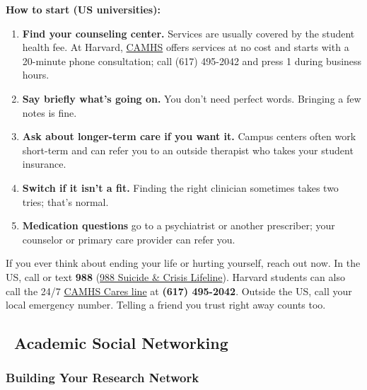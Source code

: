 \documentclass[11pt,a4paper]{article}
\begin{document}
\textbf{How to start (US universities):}
\begin{enumerate}
    \item \textbf{Find your counseling center.} Services are usually covered by the student health fee. At Harvard, \href{https://camhs.huhs.harvard.edu/}{CAMHS} offers services at no cost and starts with a 20-minute phone consultation; call (617) 495-2042 and press 1 during business hours.
    \item \textbf{Say briefly what's going on.} You don't need perfect words. Bringing a few notes is fine.
    \item \textbf{Ask about longer-term care if you want it.} Campus centers often work short-term and can refer you to an outside therapist who takes your student insurance.
    \item \textbf{Switch if it isn't a fit.} Finding the right clinician sometimes takes two tries; that's normal.
    \item \textbf{Medication questions} go to a psychiatrist or another prescriber; your counselor or primary care provider can refer you.
\end{enumerate}

\begin{tcolorbox}[colback=red!5,colframe=red!50,title={If You Are in Crisis}]
If you ever think about ending your life or hurting yourself, reach out now. In the US, call or text \textbf{988} (\href{https://988lifeline.org/}{988 Suicide \& Crisis Lifeline}). Harvard students can also call the 24/7 \href{https://camhs.huhs.harvard.edu/our-services/camhs-cares-line}{CAMHS Cares line} at \textbf{(617) 495-2042}. Outside the US, call your local emergency number. Telling a friend you trust right away counts too.
\end{tcolorbox}

\subsection{\faNetworkWired~Academic Social Networking}

\subsubsection{Building Your Research Network}
\end{document}

